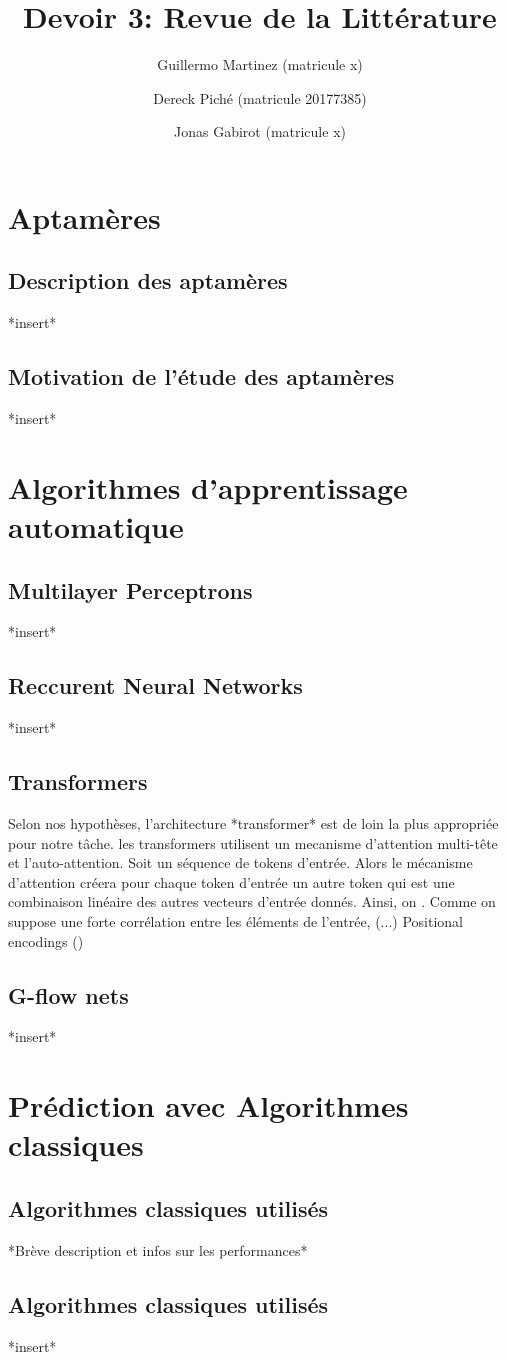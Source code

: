 \documentclass{article}
\title{Devoir 3: Revue de la Littérature}
\author
{
    Guillermo Martinez (matricule x)
    \and
    Dereck Piché (matricule 20177385)
    \and
    Jonas Gabirot (matricule x)
}
\begin{document}
\maketitle

\section*{Aptamères}
\subsection*{Description des aptamères}
*insert*
\subsection*{Motivation de l'étude des aptamères}
*insert*

\section*{Algorithmes d'apprentissage automatique}
\subsection*{Multilayer Perceptrons}
*insert*
\subsection*{Reccurent Neural Networks}
*insert*
\subsection*{Transformers}
Selon nos hypothèses, l'architecture *transformer*  est de loin
la plus appropriée pour notre tâche. les transformers utilisent 
un mecanisme d'attention multi-tête et l'auto-attention. Soit
un séquence de tokens d'entrée. Alors le mécanisme d'attention 
créera pour chaque token d'entrée un autre token qui est une 
combinaison linéaire des autres vecteurs d'entrée donnés. Ainsi, 
on \cite{transPaper}. Comme on suppose une forte corrélation 
entre les éléments de l'entrée, (...) Positional encodings ()
\subsection*{G-flow nets}
*insert*

\section*{Prédiction avec Algorithmes classiques}
\subsection*{Algorithmes classiques utilisés}
*Brève description et infos sur les performances*
\subsection*{Algorithmes classiques utilisés}
*insert*



\end{document}
